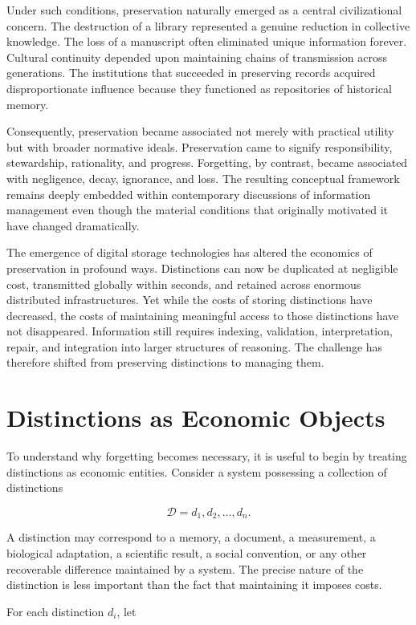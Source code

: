 \documentclass[12pt,oneside]{book}
\theoremstyle{plain} \newtheorem{theorem}{Theorem}[chapter] \newtheorem{lemma}[theorem]{Lemma} \newtheorem{proposition}[theorem]{Proposition} \newtheorem{corollary}[theorem]{Corollary}
\theoremstyle{definition} \newtheorem{definition}[theorem]{Definition} \newtheorem{axiom}[theorem]{Axiom} \newtheorem{construction}[theorem]{Construction}
\theoremstyle{remark} \newtheorem{remark}[theorem]{Remark} \newtheorem{example}[theorem]{Example}
\newcommand{\D}{\mathcal{D}} \newcommand{\R}{\mathcal{R}} \newcommand{\F}{\mathcal{F}} \newcommand{\U}{\mathcal{U}} \newcommand{\M}{\mathcal{M}} \newcommand{\G}{\Gamma}
\begin{document}
Under such conditions, preservation naturally emerged as a central civilizational concern. The destruction of a library represented a genuine reduction in collective knowledge. The loss of a manuscript often eliminated unique information forever. Cultural continuity depended upon maintaining chains of transmission across generations. The institutions that succeeded in preserving records acquired disproportionate influence because they functioned as repositories of historical memory.

Consequently, preservation became associated not merely with practical utility but with broader normative ideals. Preservation came to signify responsibility, stewardship, rationality, and progress. Forgetting, by contrast, became associated with negligence, decay, ignorance, and loss. The resulting conceptual framework remains deeply embedded within contemporary discussions of information management even though the material conditions that originally motivated it have changed dramatically.

The emergence of digital storage technologies has altered the economics of preservation in profound ways. Distinctions can now be duplicated at negligible cost, transmitted globally within seconds, and retained across enormous distributed infrastructures. Yet while the costs of storing distinctions have decreased, the costs of maintaining meaningful access to those distinctions have not disappeared. Information still requires indexing, validation, interpretation, repair, and integration into larger structures of reasoning. The challenge has therefore shifted from preserving distinctions to managing them.

\section{Distinctions as Economic Objects}

To understand why forgetting becomes necessary, it is useful to begin by treating distinctions as economic entities. Consider a system possessing a collection of distinctions

\[
\D={d_1,d_2,\ldots,d_n}.
\]

A distinction may correspond to a memory, a document, a measurement, a biological adaptation, a scientific result, a social convention, or any other recoverable difference maintained by a system. The precise nature of the distinction is less important than the fact that maintaining it imposes costs.

For each distinction $d_i$, let
\end{document}
